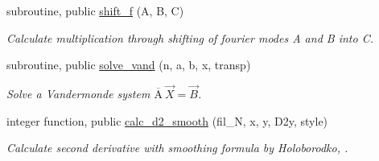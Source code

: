 \begin{DoxyCompactItemize}
subroutine, public \hyperlink{namespacenum__utilities_a859f442a1b860d82662eed17c4374c38}{shift\+\_\+f} (A, B, C)
\begin{DoxyCompactList}\small\item\em Calculate multiplication through shifting of fourier modes A and B into C. \end{DoxyCompactList}\item 
subroutine, public \hyperlink{namespacenum__utilities_a54c65e345182e2e7e13ac14a0ba3647a}{solve\+\_\+vand} (n, a, b, x, transp)
\begin{DoxyCompactList}\small\item\em Solve a Vandermonde system $\overline{\text{A}} \ \vec{X} = \vec{B}$. \end{DoxyCompactList}\item 
integer function, public \hyperlink{namespacenum__utilities_ab4c91a6478c4dd6f519f8ccbccc4094f}{calc\+\_\+d2\+\_\+smooth} (fil\+\_\+N, x, y, D2y, style)
\begin{DoxyCompactList}\small\item\em Calculate second derivative with smoothing formula by Holoborodko, \cite{holoborodko2008diff}. \end{DoxyCompactList}\end{DoxyCompactItemize}
